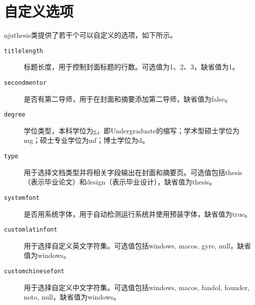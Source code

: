 \section{自定义选项}
\label{sec:classoptions}

njuthesis类提供了若干个可以自定义的选项，如下所示。
\begin{description}
    \item[\texttt{titlelength}] 标题长度，用于控制封面标题的行数。可选值为1、2、3，缺省值为1。
    \item[\texttt{secondmentor}] 是否有第二导师，用于在封面和摘要添加第二导师，缺省值为false。
    \item[\texttt{degree}] 学位类型，本科学位为g，即Undergraduate的缩写；学术型硕士学位为mg；硕士专业学位为mf；博士学位为d。
    \item[\texttt{type}] 用于选择文档类型并将相关字段输出在封面和摘要页。可选值包括thesis（表示毕业论文）和design（表示毕业设计），缺省值为thesis。
    \item[\texttt{systemfont}] 是否用系统字体，用于自动检测运行系统并使用预装字体，缺省值为true。
    \item[\texttt{customlatinfont}] 用于选择自定义英文字符集。可选值包括windows, macos, gyre, null，缺省值为windows。
    \item[\texttt{customchinesefont}] 用于选择自定义中文字符集。可选值包括windows, macos, fandol, founder, noto, null，缺省值为windows。
\end{description}
